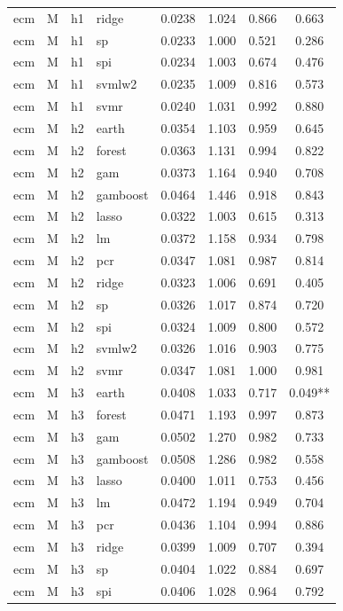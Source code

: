 \begin{ThreePartTable}
\begin{longtable}[t]{llclcccc}
ecm & M & h1 & ridge & 0.0238 & 1.024 & 0.866 & 0.663\\
ecm & M & h1 & sp & 0.0233 & 1.000 & 0.521 & 0.286\\
ecm & M & h1 & spi & 0.0234 & 1.003 & 0.674 & 0.476\\
ecm & M & h1 & svmlw2 & 0.0235 & 1.009 & 0.816 & 0.573\\
ecm & M & h1 & svmr & 0.0240 & 1.031 & 0.992 & 0.880\\
\addlinespace
ecm & M & h2 & earth & 0.0354 & 1.103 & 0.959 & 0.645\\
ecm & M & h2 & forest & 0.0363 & 1.131 & 0.994 & 0.822\\
ecm & M & h2 & gam & 0.0373 & 1.164 & 0.940 & 0.708\\
ecm & M & h2 & gamboost & 0.0464 & 1.446 & 0.918 & 0.843\\
ecm & M & h2 & lasso & 0.0322 & 1.003 & 0.615 & 0.313\\
ecm & M & h2 & lm & 0.0372 & 1.158 & 0.934 & 0.798\\
ecm & M & h2 & pcr & 0.0347 & 1.081 & 0.987 & 0.814\\
ecm & M & h2 & ridge & 0.0323 & 1.006 & 0.691 & 0.405\\
ecm & M & h2 & sp & 0.0326 & 1.017 & 0.874 & 0.720\\
ecm & M & h2 & spi & 0.0324 & 1.009 & 0.800 & 0.572\\
ecm & M & h2 & svmlw2 & 0.0326 & 1.016 & 0.903 & 0.775\\
ecm & M & h2 & svmr & 0.0347 & 1.081 & 1.000 & 0.981\\
\addlinespace
ecm & M & h3 & earth & 0.0408 & 1.033 & 0.717 & 0.049**\\
ecm & M & h3 & forest & 0.0471 & 1.193 & 0.997 & 0.873\\
ecm & M & h3 & gam & 0.0502 & 1.270 & 0.982 & 0.733\\
ecm & M & h3 & gamboost & 0.0508 & 1.286 & 0.982 & 0.558\\
ecm & M & h3 & lasso & 0.0400 & 1.011 & 0.753 & 0.456\\
ecm & M & h3 & lm & 0.0472 & 1.194 & 0.949 & 0.704\\
ecm & M & h3 & pcr & 0.0436 & 1.104 & 0.994 & 0.886\\
ecm & M & h3 & ridge & 0.0399 & 1.009 & 0.707 & 0.394\\
ecm & M & h3 & sp & 0.0404 & 1.022 & 0.884 & 0.697\\
ecm & M & h3 & spi & 0.0406 & 1.028 & 0.964 & 0.792\\

\end{longtable}
\end{ThreePartTable}

